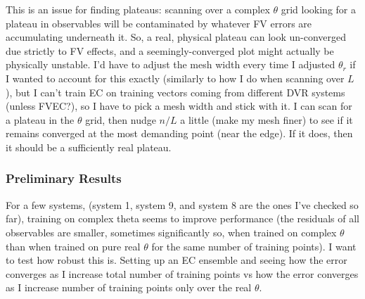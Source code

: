 \documentclass[12pt]{article}
\begin{document}
	This is an issue for finding plateaus: scanning over a complex $\theta$ grid looking for a plateau in observables will be contaminated by whatever FV errors are accumulating underneath it. So, a real, physical plateau can look un-converged due strictly to FV effects, and a seemingly-converged plot might actually be physically unstable. I'd have to adjust the mesh width every time I adjusted $\theta_r$ if I wanted to account for this exactly (similarly to how I do when scanning over $L$), but I can't train EC on training vectors coming from different DVR systems (unless FVEC?), so I have to pick a mesh width and stick with it. I can scan for a plateau in the $\theta$ grid, then nudge $n/L$ a little (make my mesh finer) to see if it remains converged at the most demanding point (near the edge). If it does, then it should be a sufficiently real plateau.
	
	\subsubsection*{Preliminary Results}
	For a few systems, (system 1, system 9, and system 8 are the ones I've checked so far), training on complex theta seems to improve performance (the residuals of all observables are smaller, sometimes significantly so, when trained on complex $\theta$ than when trained on pure real $\theta$ for the same number of training points). I want to test how robust this is. Setting up an EC ensemble and seeing how the error converges as I increase total number of training points vs how the error converges as I increase number of training points only over the real $\theta$. 
\end{document}
